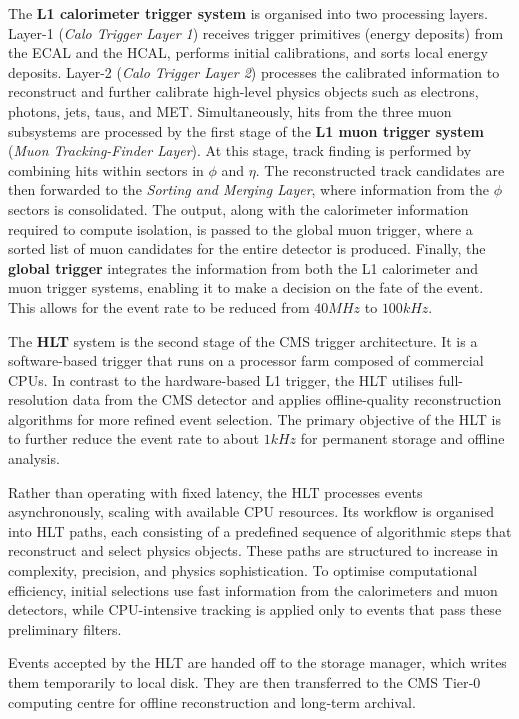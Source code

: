 The \textbf{L1 calorimeter trigger system} is organised into two processing layers. Layer-1 (\textit{Calo Trigger Layer 1}) receives trigger primitives (energy deposits) from the ECAL and the HCAL, performs initial calibrations, and sorts local energy deposits. Layer-2 (\textit{Calo Trigger Layer 2}) processes the calibrated information to reconstruct and further calibrate high-level physics objects such as electrons, photons, jets, taus, and MET. Simultaneously, hits from the three muon subsystems are processed by the first stage of the \textbf{L1 muon trigger system} (\textit{Muon Tracking-Finder Layer}). At this stage, track finding is performed by combining hits within sectors in $\phi$ and $\eta$. The reconstructed track candidates are then forwarded to the \textit{Sorting and Merging Layer}, where information from the $\phi$ sectors is consolidated. The output, along with the calorimeter information required to compute isolation, is passed to the global muon trigger, where a sorted list of muon candidates for the entire detector is produced. Finally, the \textbf{global trigger} integrates the information from both the L1 calorimeter and muon trigger systems, enabling it to make a decision on the fate of the event. This allows for the event rate to be reduced from $40\unit{MHz}$ to $100\unit{kHz}$.

The \textbf{HLT} system is the second stage of the CMS trigger architecture. It is a software-based trigger that runs on a processor farm composed of commercial CPUs. In contrast to the hardware-based L1 trigger, the HLT utilises full-resolution data from the CMS detector and applies offline-quality reconstruction algorithms for more refined event selection. The primary objective of the HLT is to further reduce the event rate to about $1\unit{kHz}$ for permanent storage and offline analysis. 

Rather than operating with fixed latency, the HLT processes events asynchronously, scaling with available CPU resources. Its workflow is organised into HLT paths, each consisting of a predefined sequence of algorithmic steps that reconstruct and select physics objects. These paths are structured to increase in complexity, precision, and physics sophistication. To optimise computational efficiency, initial selections use fast information from the calorimeters and muon detectors, while CPU-intensive tracking is applied only to events that pass these preliminary filters. 

Events accepted by the HLT are handed off to the storage manager, which writes them temporarily to local disk. They are then transferred to the CMS Tier‑0 computing centre for offline reconstruction and long‑term archival.


